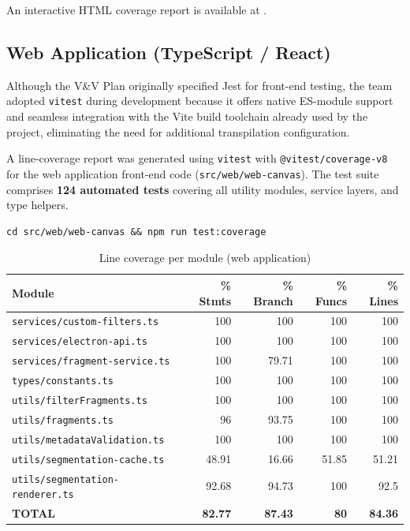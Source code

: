 \documentclass[12pt, titlepage]{article}
\begin{document}
An interactive HTML coverage report is available at
.

\subsection{Web Application (TypeScript / React)}

Although the V\&V Plan originally specified Jest for front-end testing, the team
adopted \texttt{vitest} during development because it offers native ES-module
support and seamless integration with the Vite build toolchain already used by
the project, eliminating the need for additional transpilation configuration.

A line-coverage report was generated using \texttt{vitest} with
\texttt{@vitest/coverage-v8} for the web application front-end code
(\texttt{src/web/web-canvas}).  The test suite comprises \textbf{124 automated
tests} covering all utility modules, service layers, and type helpers.

\begin{verbatim}
cd src/web/web-canvas && npm run test:coverage
\end{verbatim}

\begin{table}[h]
\centering
\scriptsize
\begin{tabular}{l r r r r}
\hline
\textbf{Module} & \textbf{\% Stmts} & \textbf{\% Branch} & \textbf{\% Funcs} & \textbf{\% Lines} \\
\hline
\texttt{services/custom-filters.ts}        & 100   & 100   & 100   & 100   \\
\texttt{services/electron-api.ts}          & 100   & 100   & 100   & 100   \\
\texttt{services/fragment-service.ts}      & 100   & 79.71 & 100   & 100   \\
\texttt{types/constants.ts}                & 100   & 100   & 100   & 100   \\
\texttt{utils/filterFragments.ts}          & 100   & 100   & 100   & 100   \\
\texttt{utils/fragments.ts}               & 96    & 93.75 & 100   & 100   \\
\texttt{utils/metadataValidation.ts}       & 100   & 100   & 100   & 100   \\
\texttt{utils/segmentation-cache.ts}       & 48.91 & 16.66 & 51.85 & 51.21 \\
\texttt{utils/segmentation-renderer.ts}    & 92.68 & 94.73 & 100   & 92.5  \\
\hline
\textbf{TOTAL}                             & \textbf{82.77} & \textbf{87.43} & \textbf{80} & \textbf{84.36} \\
\hline
\end{tabular}
\caption{Line coverage per module (web application)}
\end{table}
\end{document}
